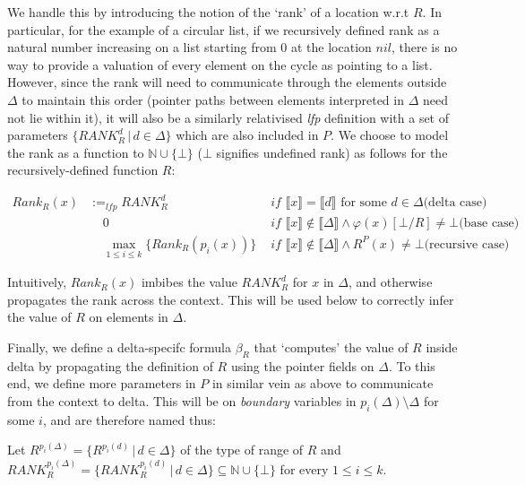 We handle this by introducing the notion of the `rank' of a location w.r.t $R$. In particular, for the example of a circular list, if we recursively defined rank as a natural number increasing on a list starting from $0$ at the location $nil$, there is no way to provide a valuation of every element on the cycle as pointing to a list. However, since the rank will need to communicate through the elements outside $\Delta{}$ to maintain this order (pointer paths between elements interpreted in $\Delta{}$ need not lie within it), it will also be a similarly relativised \textit{lfp} definition with a set of parameters $\{\textit{RANK}_{R}^{d} \,|\, d \in{} \Delta{} \}$ which are also included in $P$. We choose to model the rank as a function to $\mathbb{N} \cup{} \{\bot{}\}$ ($\bot{}$ signifies undefined rank) as follows for the recursively-defined function $R$:

\begin{align*}
Rank_{R}(x) & :=_\textit{lfp} \textit{RANK}_{R}^{d} & \textit{ if } \llbracket{}x\rrbracket{} = \llbracket{}d\rrbracket{} \textrm{ for some } d \in{}\Delta{} \textrm{(delta case)}\\
& ~~~~~ 0 & \textit{ if } \llbracket{}x\rrbracket{} \notin{} \llbracket{}\Delta{}\rrbracket{} \land{} \varphi(x)[\bot{}/R] \neq{} \bot{} \textrm{(base case)}\\
& ~~~~~ \max\limits_{1 \leq{} i \leq{} k}\{Rank_{R}(p_i(x))\} & \textit{ if } \llbracket{}x\rrbracket{} \notin{} \llbracket{}\Delta{}\rrbracket{} \land{} R^{P}(x) \neq{} \bot{} \textrm{(recursive case)}
\end{align*}

Intuitively, $Rank_{R}(x)$ imbibes the value $RANK_{R}^{d}$ for $x$ in $\Delta{}$, and otherwise propagates the rank across the context. This will be used below to correctly infer the value of $R$ on elements in $\Delta{}$. 

Finally, we define a delta-specifc formula $\beta_{R}$ that `computes' the value of $R$ inside delta by propagating the definition of $R$ using the pointer fields on $\Delta{}$. To this end, we define more parameters in $P$ in similar vein as above to communicate from the context to delta. This will be on \emph{boundary} variables in $p_i(\Delta{}) \setminus{} \Delta{}$ for some $i$, and are therefore named thus:

Let $R^{p_i(\Delta)} = \{ R^{p_i(d)} \,|\, d \in{} \Delta{} \}$ of the type of range of $R$ and $\textit{RANK}_{R}^{p_i(\Delta)} = \{ \textit{RANK}_{R}^{p_i(d)} \,|\, d \in{} \Delta{} \} \subseteq{} \mathbb{N} \cup{} \{\bot{}\}$ for every $1\leq{} i \leq{}k$.

